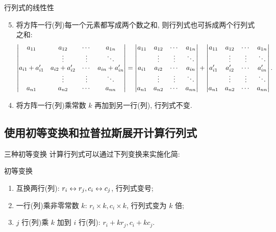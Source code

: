 \begin{frame}{行列式的线性性}
	\onslide<+->
	\begin{alertblock@}
		\begin{enumerate}
			\setcounter{enumi}{4}
			\item 将方阵一行(列)每一个元素都写成两个数之和, 则行列式也可拆成两个行列式之和:
		\[\left|\begin{matrix}a_{11}&a_{12}&\cdots&a_{1n}\\
		&\vdots&\vdots&\ddots\\
		a_{i1}+a'_{i1}&a_{i2}+a'_{i2}&\cdots&a_{in}+a'_{in}\\
		&\vdots&\vdots&\ddots\\
		a_{n1}&a_{n2}&\cdots&a_{nn}\end{matrix}\right|=\left|\begin{matrix}a_{11}&a_{12}&\cdots&a_{1n}\\
		&\vdots&\vdots&\ddots\\
		a_{i1}&a_{i2}&\cdots&a_{in}\\
		&\vdots&\vdots&\ddots\\
		a_{n1}&a_{n2}&\cdots&a_{nn}\end{matrix}\right|+\left|\begin{matrix}a_{11}&a_{12}&\cdots&a_{1n}\\
		&\vdots&\vdots&\ddots\\
		a'_{i1}&a'_{i2}&\cdots&a'_{in}\\
		&\vdots&\vdots&\ddots\\
		a_{n1}&a_{n2}&\cdots&a_{nn}\end{matrix}\right|.\]
		\end{enumerate}
	\end{alertblock@}
	\onslide<+->
	\begin{alertblock@}
		\begin{enumerate}
			\setcounter{enumi}{3}
			\item 将方阵一行(列)乘常数 $k$ 再加到另一行(列), 行列式不变.
		\end{enumerate}
	\end{alertblock@}
\end{frame}


\subsection{使用初等变换和拉普拉斯展开计算行列式}
\begin{frame}{三种初等变换}
	\onslide<+->
	计算行列式可以通过下列变换来实施化简:
	\onslide<+->
	\begin{block}{初等变换}
		\begin{enumerate}
		\item 互换两行(列): \alert{$r_i\leftrightarrow r_j, c_i\leftrightarrow c_j$}, 行列式变号;
		\item 一行(列)乘非零常数 $k$: \alert{$r_i\times k, c_i\times k$}, 行列式变为 $k$ 倍;
		\item $j$ 行(列)乘 $k$ 加到 $i$ 行(列): \alert{$r_i+kr_j, c_i+kc_j$}.
	\end{enumerate}
	\end{block}
\end{frame}



